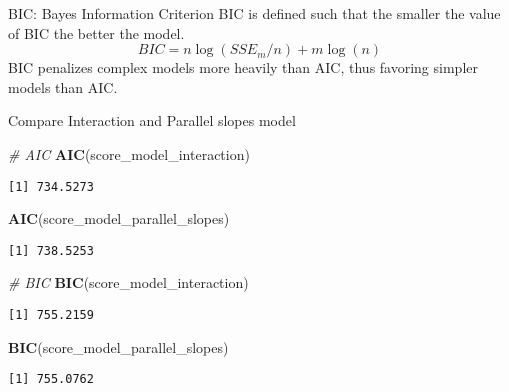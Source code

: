 \documentclass[
  ignorenonframetext,
]{beamer}
\newenvironment{Shaded}{\begin{snugshade}}{\end{snugshade}}
\newcommand{\CommentTok}[1]{\textcolor[rgb]{0.56,0.35,0.01}{\textit{#1}}}
\newcommand{\FunctionTok}[1]{\textcolor[rgb]{0.13,0.29,0.53}{\textbf{#1}}}
\newcommand{\NormalTok}[1]{#1}
\begin{document}
\begin{frame}{BIC: Bayes Information Criterion}
\protect\hypertarget{bic-bayes-information-criterion}{}
BIC is defined such that the smaller the value of BIC the better the
model. \[BIC=n\log (SSE_m/n)+m\log(n)\] BIC penalizes complex models
more heavily than AIC, thus favoring simpler models than AIC.
\end{frame}

\begin{frame}[fragile]{Compare Interaction and Parallel slopes model}
\protect\hypertarget{compare-interaction-and-parallel-slopes-model-3}{}
\normalsize

\begin{Shaded}
\begin{Highlighting}[]
\CommentTok{\# AIC}
\FunctionTok{AIC}\NormalTok{(score\_model\_interaction)}
\end{Highlighting}
\end{Shaded}

\begin{verbatim}
[1] 734.5273
\end{verbatim}

\begin{Shaded}
\begin{Highlighting}[]
\FunctionTok{AIC}\NormalTok{(score\_model\_parallel\_slopes)}
\end{Highlighting}
\end{Shaded}

\begin{verbatim}
[1] 738.5253
\end{verbatim}

\begin{Shaded}
\begin{Highlighting}[]
\CommentTok{\# BIC}
\FunctionTok{BIC}\NormalTok{(score\_model\_interaction)}
\end{Highlighting}
\end{Shaded}

\begin{verbatim}
[1] 755.2159
\end{verbatim}

\begin{Shaded}
\begin{Highlighting}[]
\FunctionTok{BIC}\NormalTok{(score\_model\_parallel\_slopes)}
\end{Highlighting}
\end{Shaded}

\begin{verbatim}
[1] 755.0762
\end{verbatim}

\normalsize
\end{frame}
\end{document}
